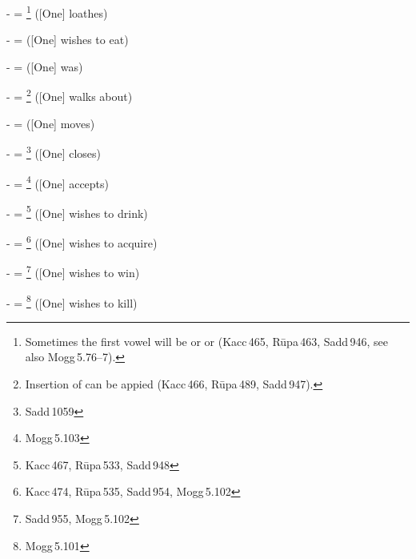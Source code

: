 -  = \footnote{Sometimes the first vowel will be  or  or  (Kacc\,465, R\=upa\,463, Sadd\,946, see also Mogg\,5.76--7).} ([One] loathes)\par
-  =  ([One] wishes to eat)\par
-  =  ([One] was)\par
-  = \footnote{Insertion of  can be appied (Kacc\,466, R\=upa\,489, Sadd\,947).} ([One] walks about)\par
-  =  ([One] moves)\par
-  = \footnote{Sadd\,1059} ([One] closes)\par
-  = \footnote{Mogg\,5.103} ([One] accepts)\par
-  = \footnote{Kacc\,467, R\=upa\,533, Sadd\,948} ([One] wishes to drink)\par
-  = \footnote{Kacc\,474, R\=upa\,535, Sadd\,954, Mogg\,5.102} ([One] wishes to acquire)\par
-  = \footnote{Sadd\,955, Mogg\,5.102} ([One] wishes to win)\par
-  = \footnote{Mogg\,5.101} ([One] wishes to kill)\par
